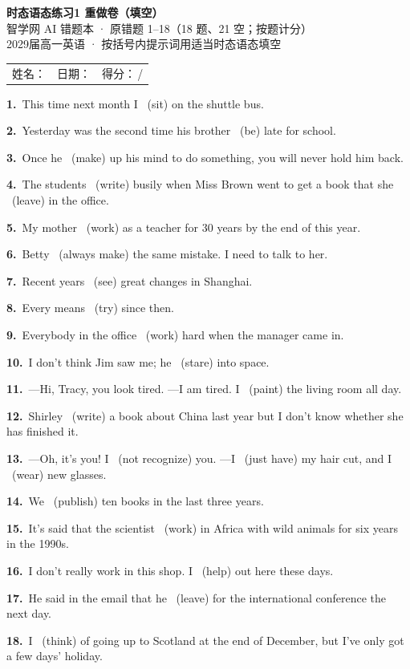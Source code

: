 \documentclass[10pt,a4paper]{article}
\newcommand{\blank}{\underline{\hspace{2.4cm}}}
\newcommand{\ff}[2]{\noindent\textbf{#1.}~#2\par\vspace{0.62em}}
\begin{document}
\pagestyle{plain}

\begin{center}
{\LARGE\bfseries 时态语态练习1 \quad 重做卷（填空）}\\[0.25em]
{\large 智学网 AI 错题本 · 原错题 1--18（18 题、21 空；按题计分）}\\[0.22em]
{\small 2029届高一英语 · 按括号内提示词用适当时态语态填空}
\end{center}

\vspace{0.3em}
\noindent\begin{tabular}{@{}p{}@{}p{}@{}p{}@{}}
姓名：\underline{\hspace{2.2cm}} & 日期：\underline{\hspace{2.2cm}} & 得分：\underline{\hspace{1.5cm}}\,/\enspace 18 \\
\end{tabular}

\vspace{0.6em}
\ff{1}{This time next month I \blank\ (sit) on the shuttle bus.}
\ff{2}{Yesterday was the second time his brother \blank\ (be) late for school.}
\ff{3}{Once he \blank\ (make) up his mind to do something, you will never hold him back.}
\ff{4}{The students \blank\ (write) busily when Miss Brown went to get a book that she \blank\ (leave) in the office.}
\ff{5}{My mother \blank\ (work) as a teacher for 30 years by the end of this year.}
\ff{6}{Betty \blank\ (always make) the same mistake. I need to talk to her.}
\ff{7}{Recent years \blank\ (see) great changes in Shanghai.}
\ff{8}{Every means \blank\ (try) since then.}
\ff{9}{Everybody in the office \blank\ (work) hard when the manager came in.}
\ff{10}{I don't think Jim saw me; he \blank\ (stare) into space.}
\ff{11}{---Hi, Tracy, you look tired. \quad ---I am tired. I \blank\ (paint) the living room all day.}
\ff{12}{Shirley \blank\ (write) a book about China last year but I don't know whether she has finished it.}
\ff{13}{---Oh, it's you! I \blank\ (not recognize) you. \quad ---I \blank\ (just have) my hair cut, and I \blank\ (wear) new glasses.}
\ff{14}{We \blank\ (publish) ten books in the last three years.}
\ff{15}{It's said that the scientist \blank\ (work) in Africa with wild animals for six years in the 1990s.}
\ff{16}{I don't really work in this shop. I \blank\ (help) out here these days.}
\ff{17}{He said in the email that he \blank\ (leave) for the international conference the next day.}
\ff{18}{I \blank\ (think) of going up to Scotland at the end of December, but I've only got a few days' holiday.}
\end{document}
